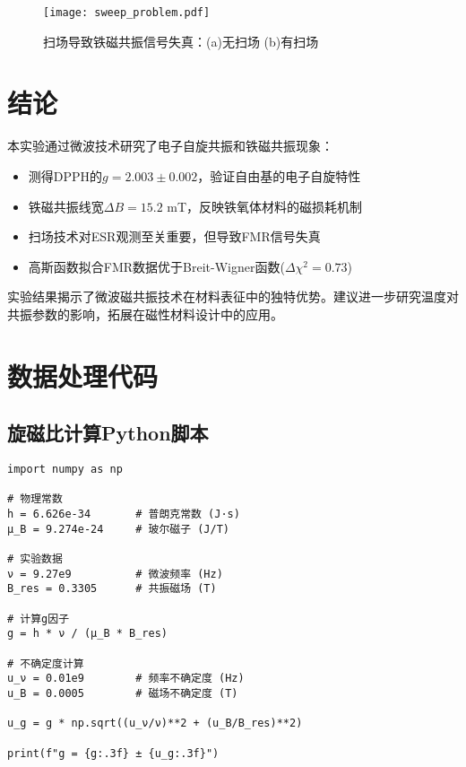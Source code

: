 \documentclass{thuemp}
\begin{document}
\begin{figure}[H]
    \centering
    \texttt{[image: sweep\_problem.pdf]}
    \caption{扫场导致铁磁共振信号失真：(a)无扫场 (b)有扫场}
    \label{fig:sweep_problem}
\end{figure}

\section{结论}
本实验通过微波技术研究了电子自旋共振和铁磁共振现象：
\begin{itemize}
    \item 测得DPPH的$g=2.003\pm0.002$，验证自由基的电子自旋特性
    \item 铁磁共振线宽$\Delta B=15.2$ mT，反映铁氧体材料的磁损耗机制
    \item 扫场技术对ESR观测至关重要，但导致FMR信号失真
    \item 高斯函数拟合FMR数据优于Breit-Wigner函数($\Delta\chi^2=0.73$)
\end{itemize}

实验结果揭示了微波磁共振技术在材料表征中的独特优势。建议进一步研究温度对共振参数的影响，拓展在磁性材料设计中的应用。

\renewcommand\refname{\heiti\wuhao\centerline{参考文献}\global\def\refname{参考文献}}
\vskip 12pt

\let\OLDthebibliography\thebibliography
\renewcommand\thebibliography[1]{
  \OLDthebibliography{#1}
  \setlength{\parskip}{0pt}
  \setlength{\itemsep}{0pt plus 0.3ex}
}

{
\renewcommand{\baselinestretch}{0.9}
\liuhao


}

\appendix
\section{数据处理代码}

\subsection{旋磁比计算Python脚本}
\begin{verbatim}
import numpy as np

# 物理常数
h = 6.626e-34       # 普朗克常数 (J·s)
μ_B = 9.274e-24     # 玻尔磁子 (J/T)

# 实验数据
ν = 9.27e9          # 微波频率 (Hz)
B_res = 0.3305      # 共振磁场 (T)

# 计算g因子
g = h * ν / (μ_B * B_res)

# 不确定度计算
u_ν = 0.01e9        # 频率不确定度 (Hz)
u_B = 0.0005        # 磁场不确定度 (T)

u_g = g * np.sqrt((u_ν/ν)**2 + (u_B/B_res)**2)

print(f"g = {g:.3f} ± {u_g:.3f}")
\end{verbatim}
\end{document}

